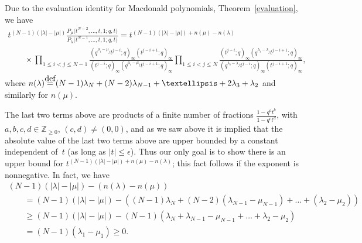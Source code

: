 \documentclass[11pt]{article}
\numberwithin{equation}{section}
\newcommand\myeq{\mathrel{\stackrel{\makebox[0pt]{\mbox{\normalfont\tiny def}}}{=}}}
\newcommand{\Z}{\mathbb{Z}}
\begin{document}
Due to the evaluation identity for Macdonald polynomials, Theorem~\ref{evaluation}, we have
\begin{gather*}
t^{(N-1)(|\lambda| - |\mu|)}\frac{P_{\mu}\big(t^{N-2}, \dots, t, 1; q, t\big)}{P_{\lambda}\big(t^{N-1}, \dots, t, 1; q, t\big)} = t^{(N-1)(|\lambda| - |\mu|) + n(\mu) - n(\lambda)} \\
\qquad{} \times\prod_{1\leq i < j\leq N-1}{\frac{(q^{\mu_i - \mu_j}t^{j-i}; q)_{\infty}(t^{j-i+1}; q)_{\infty}}{(t^{j-i}; q)_{\infty}(q^{\mu_i - \mu_j}t^{j-i+1}; q)_{\infty}}}\prod_{1\leq i < j\leq N}{\frac{(t^{j-i}; q)_{\infty}(q^{\lambda_i - \lambda_j}t^{j-i+1}; q)_{\infty}}{(q^{\lambda_i - \lambda_j}t^{j-i}; q)_{\infty}(t^{j-i+1}; q)_{\infty}}},
\end{gather*}
where $n(\lambda) \myeq (N-1)\lambda_N + (N-2)\lambda_{N-1} + \dots + 2\lambda_3 + \lambda_2$ and similarly for $n(\mu)$.

The last two terms above are products of a f\/inite number of fractions $\frac{1 - q^at^b}{1 - q^ct^d}$, with $a, b, c, d\in\Z_{\geq 0}$, $(c, d)\neq (0, 0)$, and as we saw above it is implied that the absolute value of the last two terms above are upper bounded by a constant independent of~$t$ (as long as $|t| \leq \epsilon$). Thus our only goal is to show there is an upper bound for $t^{(N-1)(|\lambda| - |\mu|) + n(\mu) - n(\lambda)}$; this fact follows if the exponent is nonnegative. In fact, we have
\begin{gather*}
(N - 1)(|\lambda| - |\mu|) - (n(\lambda) - n(\mu)) \\
\qquad{} =(N - 1)(|\lambda| - |\mu|) - ((N - 1)\lambda_N + (N - 2)(\lambda_{N-1} - \mu_{N-1}) + \dots + (\lambda_2 - \mu_2)) \\
\qquad {} \geq (N-1)(|\lambda| - |\mu|) - (N-1)(\lambda_N + \lambda_{N-1} - \mu_{N-1} + \dots + \lambda_2 - \mu_2)\\
\qquad{} = (N - 1)(\lambda_1 - \mu_1)\geq 0.
\end{gather*}
\end{document}
